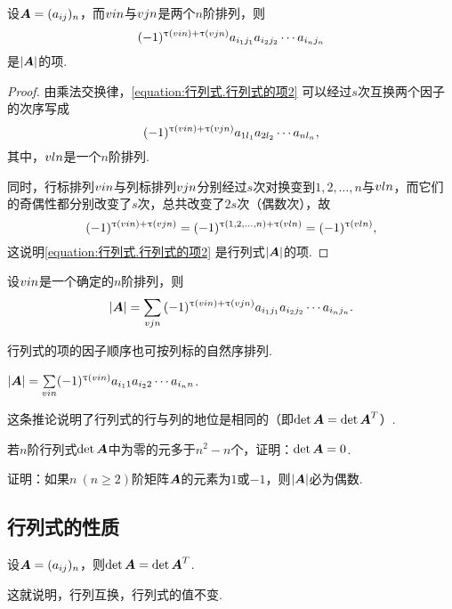 \begin{lemma}
设\(\boldsymbol{A}=(a_{ij})_n\)，而\(v{i}{n}\)与\(v{j}{n}\)是两个\(n\)阶排列，则
\begin{equation}\label{equation:行列式.行列式的项2}
	(-1)^{\uptau(v{i}{n})+\uptau(v{j}{n})}
	a_{i_1j_1} a_{i_2j_2} \dotsm a_{i_nj_n}
\end{equation}
是\(\abs{\boldsymbol{A}}\)的项.
\begin{proof}
由乘法交换律，\cref{equation:行列式.行列式的项2} 可以经过\(s\)次互换两个因子的次序写成\[
(-1)^{\uptau(v{i}{n})+\uptau(v{j}{n})}
	a_{1 l_1} a_{2 l_2} \dotsm a_{n l_n},
\]其中，\(v{l}{n}\)是一个\(n\)阶排列.

同时，行标排列\(v{i}{n}\)与列标排列\(v{j}{n}\)分别经过\(s\)次对换变到\(1,2,\dotsc,n\)与\(v{l}{n}\)，而它们的奇偶性都分别改变了\(s\)次，总共改变了\(2s\)次（偶数次），故\[
(-1)^{\uptau(v{i}{n})+\uptau(v{j}{n})}
= (-1)^{\uptau(1,2,\dotsc,n)+\uptau(v{l}{n})}
= (-1)^{\uptau(v{l}{n})},
\]这说明\cref{equation:行列式.行列式的项2} 是行列式\(\abs{\boldsymbol{A}}\)的项.
\end{proof}
\end{lemma}

\begin{corollary}
设\(v{i}{n}\)是一个确定的\(n\)阶排列，则\[
\abs{\boldsymbol{A}} = \sum\limits_{v{j}{n}}{
	(-1)^{\uptau(v{i}{n})+\uptau(v{j}{n})} a_{i_1 j_1} a_{i_2 j_2} \dotsm a_{i_n j_n}
}.
\]
\end{corollary}

行列式的项的因子顺序也可按列标的自然序排列.
\begin{corollary}
\(\abs{\boldsymbol{A}} =
\sum\limits_{v{i}{n}}
(-1)^{\uptau(v{i}{n})} a_{i_1 1} a_{i_2 2} \dotsm a_{i_n n}\).
\end{corollary}
这条推论说明了行列式的行与列的地位是相同的（即\(\det\boldsymbol{A} = \det\boldsymbol{A}^T\)）.

\begin{example}
若\(n\)阶行列式\(\det\boldsymbol{A}\)中为零的元多于\(n^2-n\)个，证明：\(\det\boldsymbol{A}=0\).
\end{example}

\begin{example}
证明：如果\(n\ (n\geqslant2)\)阶矩阵\(\boldsymbol{A}\)的元素为\(1\)或\(-1\)，则\(\abs{\boldsymbol{A}}\)必为偶数.
\end{example}

\subsection{行列式的性质}
\begin{property}\label{theorem:行列式.性质1}
设\(\boldsymbol{A}=(a_{ij})_n\)，则\(\det \boldsymbol{A} = \det \boldsymbol{A}^T\).
\end{property}
这就说明，行列互换，行列式的值不变.

